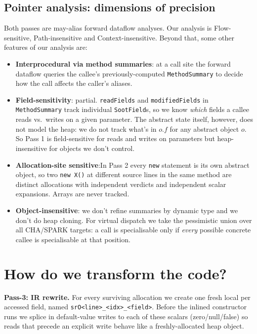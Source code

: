 \documentclass[12pt,a4paper]{article}
\begin{document}
\subsection{Pointer analysis: dimensions of precision}

Both passes are may-alias forward dataflow analyses. Our analysis is Flow-sensitive, Path-insensitive and Context-insensitive. Beyond that, some other features of our analysis are:

\begin{itemize}
    \item \textbf{Interprocedural via method summaries}: at a call site
    the forward dataflow queries the callee's previously-computed
    \texttt{MethodSummary} to decide how the call affects the caller's
    aliases.
    \item \textbf{Field-sensitivity}: partial. \texttt{readFields} and
    \texttt{modifiedFields} in \texttt{MethodSummary} track individual
    \texttt{SootField}s, so we
    know \emph{which} fields a callee reads vs.\ writes on a given
    parameter. The abstract state itself, however, does not model the
    heap: we do not track what's in $o.f$ for any abstract object $o$.
    So Pass 1 is field-sensitive for reads and writes on
    parameters but heap-insensitive for objects we don't control.

    \item \textbf{Allocation-site sensitive}:In Pass 2
    every \texttt{new} statement is its own abstract object, so two
    \texttt{new X()} at different source lines in the same method are
    distinct allocations with independent verdicts and independent
    scalar expansions. Arrays are never tracked.

    \item \textbf{Object-insensitive}: we don't refine summaries by
    dynamic type and we don't do heap cloning. For virtual dispatch we
    take the pessimistic union over all CHA/SPARK targets: a call is
    specialisable only if \emph{every} possible concrete callee is
    specialisable at that position.
\end{itemize}

\section{How do we transform the code?}

\textbf{Pass-3: IR rewrite.} For every surviving allocation we create
one fresh local per accessed field, named
\texttt{srO<line>\_<idx>\_<field>}. Before the
inlined constructor runs we splice in default-value writes to each of
these scalars (zero/null/false) so reads that precede an explicit
write behave like a freshly-allocated heap object.
\end{document}
